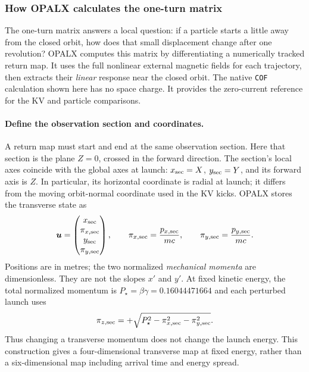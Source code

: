 \subsubsection{How OPALX calculates the one-turn matrix}
\label{sec:sc-one-turn-matrix}
The one-turn matrix answers a local question: if a particle starts a little
away from the closed orbit, how does that small displacement change after
one revolution? OPALX computes this matrix by differentiating a numerically
tracked return map. It uses the full nonlinear external magnetic fields for
each trajectory, then extracts their \emph{linear} response near the closed
orbit. The native \texttt{COF} calculation shown here has no space charge.
It provides the zero-current reference for the KV and particle comparisons.

\paragraph{Define the observation section and coordinates.}
A return map must start and end at the same observation section. Here that
section is the plane $Z=0$, crossed in the forward direction. The section's
local axes coincide with the global axes at launch: $x_{\rm sec}=X$,
$y_{\rm sec}=Y$, and its forward axis is $Z$. In particular, its horizontal
coordinate is radial at launch; it differs from the moving orbit-normal
coordinate used in the KV kicks. OPALX stores the transverse state as
\begin{equation}
 \boldsymbol{u}=\begin{pmatrix}x_{\rm sec}\\\pi_{x,\rm sec}\\
                        y_{\rm sec}\\\pi_{y,\rm sec}\end{pmatrix},
 \qquad \pi_{x,\rm sec}=\frac{p_{x,\rm sec}}{mc},\qquad
        \pi_{y,\rm sec}=\frac{p_{y,\rm sec}}{mc}.
 \label{eq:cof-coordinates}
\end{equation}
Positions are in metres; the two normalized \emph{mechanical momenta} are
dimensionless. They are not the slopes $x'$ and $y'$. At fixed kinetic energy,
the total normalized momentum is $P_\star=\beta\gamma=0.16044471664$ and each
perturbed launch uses
\begin{equation}
 \pi_{z,\rm sec}=+\sqrt{P_\star^2-\pi_{x,\rm sec}^2
                                      -\pi_{y,\rm sec}^2}.
 \label{eq:cof-longitudinal-momentum}
\end{equation}
Thus changing a transverse momentum does not change the launch energy.
This construction gives a four-dimensional transverse map at fixed energy,
rather than a six-dimensional map including arrival time and energy spread.

